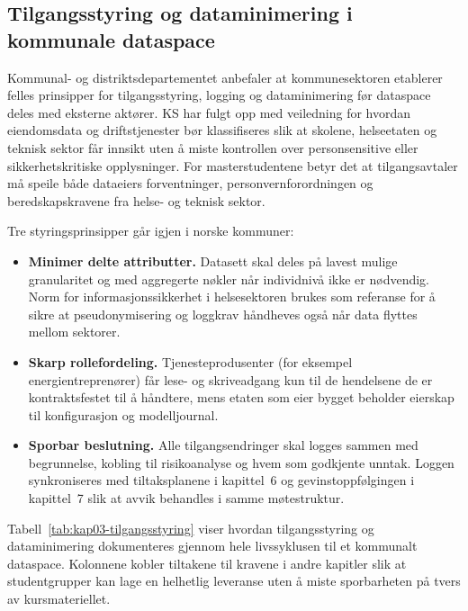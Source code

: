 \subsection{Tilgangsstyring og dataminimering i kommunale dataspace}
Kommunal- og distriktsdepartementet anbefaler at kommunesektoren etablerer felles prinsipper for tilgangsstyring, logging og
dataminimering før dataspace deles med eksterne aktører.\citep{kdd2023datadeling} KS har fulgt opp med veiledning for hvordan
eiendomsdata og driftstjenester bør klassifiseres slik at skolene, helseetaten og teknisk sektor får innsikt uten å miste
kontrollen over personsensitive eller sikkerhetskritiske opplysninger.\citep{ks2024eiendomsdrift} For masterstudentene betyr
det at tilgangsavtaler må speile både dataeiers forventninger, personvernforordningen og beredskapskravene fra helse- og
teknisk sektor.

Tre styringsprinsipper går igjen i norske kommuner:
\begin{itemize}
    \item \textbf{Minimer delte attributter.} Datasett skal deles på lavest mulige granularitet og med aggregerte nøkler når
    individnivå ikke er nødvendig. Norm for informasjonssikkerhet i helsesektoren brukes som referanse for å sikre at
    pseudonymisering og loggkrav håndheves også når data flyttes mellom sektorer.\citep{norm2023}
    \item \textbf{Skarp rollefordeling.} Tjenesteprodusenter (for eksempel energientreprenører) får lese- og skriveadgang kun til
    de hendelsene de er kontraktsfestet til å håndtere, mens etaten som eier bygget beholder eierskap til konfigurasjon og
    modelljournal.
    \item \textbf{Sporbar beslutning.} Alle tilgangsendringer skal logges sammen med begrunnelse, kobling til risikoanalyse og
    hvem som godkjente unntak. Loggen synkroniseres med tiltaksplanene i kapittel~6 og gevinstoppfølgingen i kapittel~7 slik at
    avvik behandles i samme møtestruktur.
\end{itemize}

Tabell~\ref{tab:kap03-tilgangsstyring} viser hvordan tilgangsstyring og dataminimering dokumenteres gjennom hele livssyklusen til
et kommunalt dataspace. Kolonnene kobler tiltakene til kravene i andre kapitler slik at studentgrupper kan lage en helhetlig
leveranse uten å miste sporbarheten på tvers av kursmateriellet.

